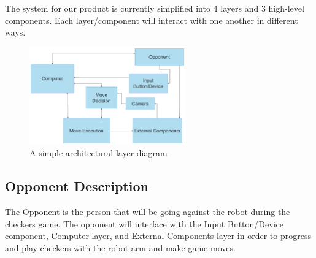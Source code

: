 The system for our product is currently simplified into 4 layers and 3 high-level components. Each layer/component will interact with one another in different ways.

\begin{figure}[h!]
	\centering
 	\includegraphics[width=0.60\textwidth]{images/layers}
 \caption{A simple architectural layer diagram}
\end{figure}


\subsection{Opponent Description}
The Opponent is the person that will be going against the robot during the checkers game. The opponent will interface with the Input Button/Device component, Computer layer, and External Components layer in order to progress and play checkers with the robot arm and make game moves.

